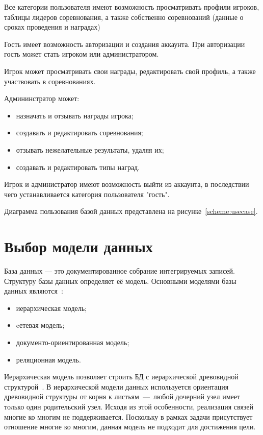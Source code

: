 Все категории пользователя имеют возможность просматривать профили игроков, таблицы лидеров соревнования, а также собственно соревнований (данные о сроках проведения и наградах)

Гость имеет возможность авторизации и создания аккаунта. При авторизации гость может стать игроком или администратором.

Игрок может просматривать свои награды, редактировать свой профиль, а также участвовать в соревнованиях.

Админинстратор может:
\begin{itemize}
	\item назначать и отзывать награды игрока;
	\item создавать и редактировать соревнования;
	\item отзывать нежелательные результаты, удаляя их;
	\item создавать и редактировать типы наград.
\end{itemize}

Игрок и администратор имеют возможность выйти из аккаунта, в последствии чего устанавливается категория пользователя "гость".

Диаграмма пользования базой данных представлена на рисунке~\ref{scheme:usecase}.


\section{Выбор модели данных}

База данных — это документированное собрание интегрируемых записей.
Структуру базы данных определяет её модель. Основными моделями базы данных являются~\cite{karpova,documentoriented}:
\begin{itemize}
	\item иерархическая модель;
	\item cетевая модель;
	\item документо-ориентированная модель;
	\item реляционная модель.
\end{itemize}

Иерархическая модель позволяет строить БД с иерархической древовидной структурой~\cite{karpova}. В иерархической модели данных используется ориентация древовидной
структуры от корня к листьям~---~любой дочерний узел имеет только один родительский узел. Исходя из этой особенности, реализация связей многие ко многим не поддерживается.
Поскольку в рамках задачи присутствует отношение многие ко многим, данная модель не подходит для достижения цели.

